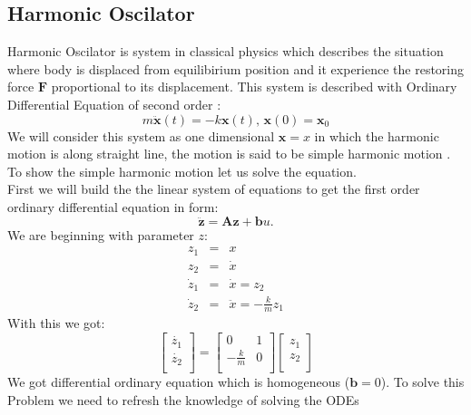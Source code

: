 \subsection{Harmonic Oscilator}
Harmonic Oscilator is  system  in classical physics which describes the situation where body is displaced from equilibirium position and it experience the restoring force $\mathbf{F}$ proportional to its displacement. This system is described with Ordinary Differential Equation of second order : 
\begin{equation}
	m\ddot{\mathbf{x}}(t) = -k\mathbf{x}(t) \texttt{,   } \mathbf{x}(0)= \mathbf{x}_0
\end{equation}
We will consider this system as one dimensional $\mathbf{x}= x$
in which the harmonic motion is along straight line, the motion is said to be simple harmonic motion \cite{osci}. To show the simple harmonic motion let us solve the equation.\\
First we will build the the linear system of equations to get the first order ordinary differential equation in form: \begin{equation}
	\ddot{\mathbf{z}}= \mathbf{A}\mathbf{z} + \mathbf{b}u.
\end{equation}
We are beginning with parameter $z$:
\begin{eqnarray}
	z_1 &=& x\\
	z_2 &=& \dot{x}\\
	\dot{z}_1 &=& \dot{x} = z_2\\
	\dot{z}_2 &=& \ddot{x} = -\frac{k}{m}z_1 
\end{eqnarray}
With this we got:
\begin{equation}
	\begin{bmatrix}
		\dot{z_1}\\
		\dot{z_2}\\
	\end{bmatrix} = \begin{bmatrix}
	0 & 1\\
	-\frac{k}{m} & 0\\
	\end{bmatrix}
	\begin{bmatrix}
		z_1\\
		z_2\\
	\end{bmatrix}
\end{equation}
We got differential ordinary equation which is homogeneous ($\mathbf{b}=0$). To solve this Problem we need to refresh the knowledge of solving the ODEs 

